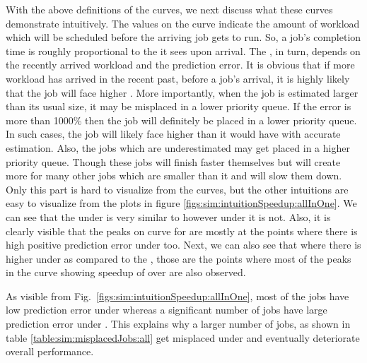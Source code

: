 With the above definitions of the curves, we next discuss what these curves
demonstrate intuitively.  The values on the \resistance curve indicate the
amount of workload which will be scheduled before the arriving job gets to run.
So, a job's completion time is roughly proportional to the \resistance it sees
upon arrival.  The \resistance, in turn, depends on the recently arrived
workload and the prediction error. It is obvious that if more workload has
arrived in the recent past, before a job's arrival, it is highly likely that
the job will face higher \resistance.  More importantly, when the job is
estimated larger than its usual size, it may be misplaced in a lower priority
queue. If the error is more than 1000\% then the job will definitely be placed
in a lower priority queue. In such cases, the job will likely face higher
\resistance than it would have with accurate estimation.  Also, the jobs which
are underestimated may get placed in a higher priority queue. Though these jobs
will finish faster themselves but will create more \resistance for many other
jobs which are smaller than it and will slow them down. Only this part is hard
to visualize from the curves, but the other intuitions are easy to visualize
from the plots in figure \ref{figs:sim:intuitionSpeedup:allInOne}.  We can see
that the \resistance under \slearn is very similar to \oracle however under
\primarybase it is not.  Also, it is clearly visible that the peaks on
\resistance curve for \primarybase are mostly at the points where there is high
positive prediction error under \primarybase too.  Next, we can also see that
where there is higher \resistance  under \primarybase as compared to the
\slearn, those are the points where most of the peaks in the curve showing
speedup of \slearn over \primarybase are also observed.

As visible from Fig.~\ref{figs:sim:intuitionSpeedup:allInOne}, most of the jobs
have low prediction error under \slearn whereas a significant number of jobs
have large prediction error under \primarybase. This explains why a larger
number of jobs, as shown in table \ref{table:sim:misplacedJobs:all}
get misplaced under \primarybase and eventually deteriorate overall
performance.

